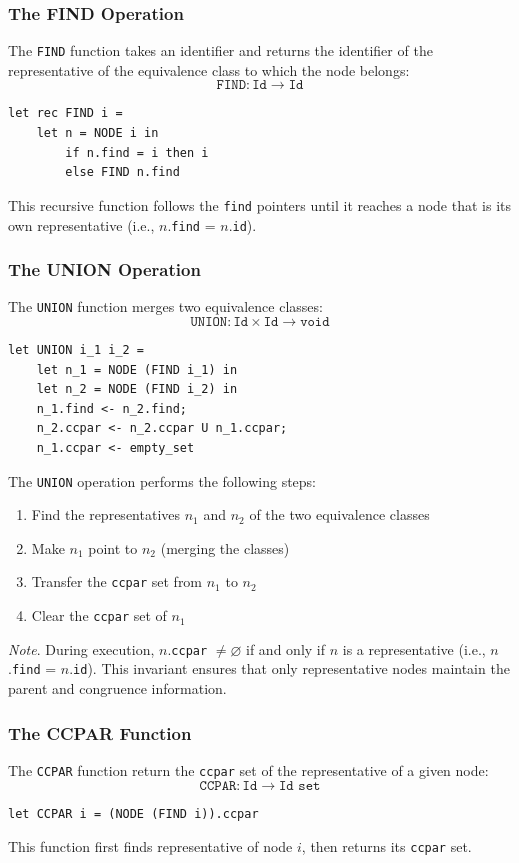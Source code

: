 \documentclass[a4paper]{article}
\theoremstyle{definition}
\begin{document}
\subsubsection{The FIND Operation}
The \texttt{FIND} function takes an identifier and returns the identifier of the representative of the equivalence 
class to which the node belongs:
\[
  \texttt{FIND} : \texttt{Id} \rightarrow \texttt{Id}
\]
\begin{lstlisting}[style=ocamlpseudo]
let rec FIND i = 
	let n = NODE i in 
		if n.find = i then i 
		else FIND n.find
\end{lstlisting}
This recursive function follows the \texttt{find} pointers until it reaches a node that is its own representative
(i.e., \( n \).\texttt{find} = \( n \).\texttt{id}).
\subsubsection{The UNION Operation}
The \texttt{UNION} function merges two equivalence classes:
\[
  \texttt{UNION} : \texttt{Id} \times \texttt{Id} \rightarrow \texttt{void}
\]
\begin{lstlisting}[style=ocamlpseudo]
let UNION i_1 i_2 = 
	let n_1 = NODE (FIND i_1) in 
	let n_2 = NODE (FIND i_2) in 
	n_1.find <- n_2.find; 
	n_2.ccpar <- n_2.ccpar U n_1.ccpar;
	n_1.ccpar <- empty_set
\end{lstlisting}
The \texttt{UNION} operation performs the following steps:
\begin{enumerate}
	\item Find the representatives \( n_1 \) and \( n_2 \) of the two equivalence classes 
	\item Make \( n_1 \) point to \( n_2 \) (merging the classes)
	\item Transfer the \texttt{ccpar} set from \( n_1 \) to \( n_2 \)   
	\item Clear the \texttt{ccpar} set of \( n_1 \)
\end{enumerate}
\textit{Note}. During execution, \( n \).\texttt{ccpar} \( \neq \varnothing \) if and only if \( n \) is a representative 
(i.e., \( n \).\texttt{find} = \( n \).\texttt{id}). This invariant ensures that only representative nodes maintain the parent and 
congruence information.
\subsubsection{The CCPAR Function}
The \texttt{CCPAR} function return the \texttt{ccpar} set of the representative of a given node:
\[
  \texttt{CCPAR}: \texttt{Id} \rightarrow \texttt{Id set}
\]
\begin{lstlisting}[style=ocamlpseudo]
let CCPAR i = (NODE (FIND i)).ccpar	
\end{lstlisting}
This function first finds representative of node \( i \), then returns its \texttt{ccpar} set.
\end{document}
